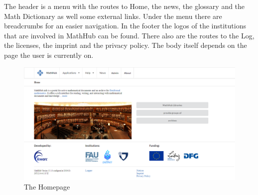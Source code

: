 \documentclass[11pt,a4paper]{article}
\begin{document}
The header is a menu with the routes to Home, the news, the glossary and the Math Dictionary as well some external links.
Under the menu there are breadcrumbs for an easier navigation.
In the footer the logos of the institutions that are involved in MathHub can be found.
There also are the routes to the Log, the licenses, the imprint and the privacy policy.
The body itself depends on the page the user is currently on. 
\begin{figure}[H]
\includegraphics[width=1\textwidth]{home.png}
\caption{The Homepage}
\end{figure}
\end{document}
